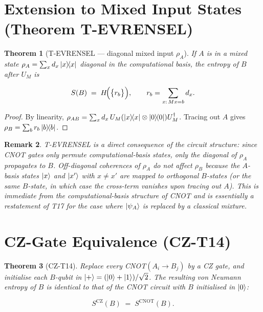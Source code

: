 \documentclass[11pt,a4paper]{article}
\newtheorem{theorem}{Theorem}[section]
\newtheorem{remark}[theorem]{Remark}
\newcommand{\Hbin}{H}
\newcommand{\VNE}{S}
\begin{document}
\section{Extension to Mixed Input States (Theorem T-EVRENSEL)}
\label{sec:mixed}

\begin{theorem}[T-EVRENSEL --- diagonal mixed input $\rho_A$]
\label{thm:tevrensel}
If $A$ is in a mixed state $\rho_A = \sum_x d_x \ketbra{x}{x}$ diagonal in
the computational basis, the entropy of $B$ after $U_M$ is

\begin{equation}
  \VNE(B) \;=\; \Hbin\!\Bigl(\bigl\{r_b\bigr\}\Bigr),
  \qquad
  r_b = \sum_{x:\, Mx = b} d_x.
  \label{eq:tevrensel}
\end{equation}
\end{theorem}

\begin{proof}
By linearity, $\rho_{AB} = \sum_x d_x \, U_M (\ketbra{x}{x} \otimes \ketbra{0}{0}) U_M^\dagger$.
Tracing out $A$ gives $\rho_B = \sum_b r_b \ketbra{b}{b}$.
\end{proof}

\begin{remark}
T-EVRENSEL is a direct consequence of the circuit structure: since CNOT gates
only permute computational-basis states, only the diagonal of $\rho_A$
propagates to $B$.  Off-diagonal coherences of $\rho_A$ do not affect $\rho_B$
because the $A$-basis states $\ket{x}$ and $\ket{x'}$ with $x \neq x'$ are
mapped to orthogonal $B$-states (or the same $B$-state, in which case the
cross-term vanishes upon tracing out $A$).  This is immediate from the
computational-basis structure of CNOT and is essentially a restatement of T17
for the case where $\ket{\psi_A}$ is replaced by a classical mixture.
\end{remark}

\section{CZ-Gate Equivalence (CZ-T14)}
\label{sec:cz}

\begin{theorem}[CZ-T14]
\label{thm:czt14}
Replace every CNOT$(A_i \to B_j)$ by a CZ gate, and initialise each $B$-qubit
in $\ket{+} = (\ket{0}+\ket{1})/\sqrt{2}$.  The resulting von Neumann entropy
of $B$ is identical to that of the CNOT circuit with $B$ initialised in
$\ket{0}$:

\begin{equation}
  \VNE^{\mathrm{CZ}}\!(B) \;=\; \VNE^{\mathrm{CNOT}}\!(B).
  \label{eq:czt14}
\end{equation}
\end{theorem}
\end{document}

